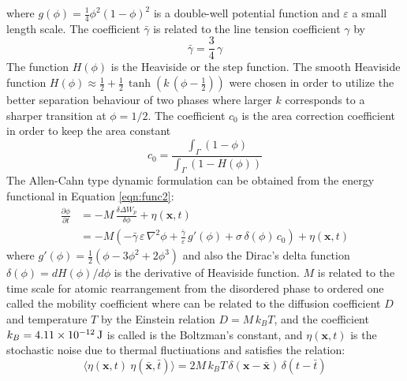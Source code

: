 \documentclass[english,12pt]{article}
\begin{document}
where $g(\phi)=\frac{1}{4}\phi^2(1-\phi)^2$ is a double-well potential function and $\varepsilon$ a small length scale. The coefficient $\bar{\gamma}$ is related to the line tension coefficient $\gamma$ by
\begin{equation}
	\bar{\gamma}=\frac{3}{4}\,\gamma
	\label{eqn:tensioncoeff}
\end{equation}
The function $H(\phi)$ is the Heaviside or the step function. The smooth Heaviside function $H(\phi)\approx\frac{1}{2}+\frac{1}{2}\,\tanh\left(k\,(\phi-\frac{1}{2})\right)$ were chosen in order to utilize the better separation behaviour of two phases where larger $k$ corresponds to a sharper transition at $\phi=1/2$. The coefficient $c_0$ is the area correction coefficient in order to keep the area constant
\begin{equation}
	c_0=\frac{\int_\Gamma(1-\phi)}{\int_{\Gamma}\left(1-H(\phi)\right)}
\end{equation}
The Allen-Cahn type dynamic formulation can be obtained from the energy functional in Equation \ref{eqn:func2}:
\begin{align}
		\frac{\partial\phi}{\partial t}&=-M\,\frac{\delta\Delta W_p}{\delta\phi}+\eta(\mathbf{x},t) \nonumber \\
		&=-M\left(-\bar{\gamma}\,\varepsilon\,\nabla^2\phi+\frac{\bar{\gamma}}{\varepsilon}\,g'(\phi)  + \sigma\,\delta(\phi)\,c_0\right)+\eta(\mathbf{x},t)
		\label{pf}
\end{align}
where $g'(\phi)=\frac{1}{2}\left(\phi-3\phi^2+2\phi^3\right)$ and also the Dirac's delta function $\delta(\phi)=dH(\phi)/d\phi$ is the derivative of Heaviside function. $M$ is related to the time scale for atomic rearrangement from the disordered phase to ordered one called the mobility coefficient where can be related to the diffusion coefficient $D$ and temperature $T$ by the Einstein relation $D=M\,k_B T$, and the coefficient $k_B=\unit[4.11\times10^{-12}]{J}$ is called is the Boltzman's constant, and $\eta(\mathbf{x},t)$ is the stochastic noise due to thermal fluctiuations and satisfies the relation:
\begin{equation}
\langle\eta(\mathbf{x},t)\ \eta(\mathbf{\bar{x}},\bar{t})\rangle=2M\,k_B T\,\delta(\mathbf{x}-\mathbf{\bar{x}})\,\delta(t-\bar{t})
\end{equation}
\end{document}
